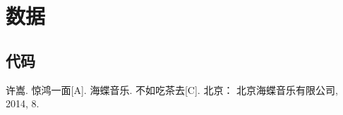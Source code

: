 \chapter{数据}

\section{代码}





\begin{thebibliography}{A1}
许嵩. 惊鸿一面[A]. 海蝶音乐. 不如吃茶去[C]. 北京： 北京海蝶音乐有限公司, 2014, 8.

\end{thebibliography}